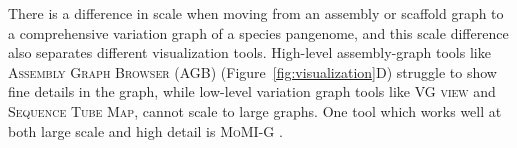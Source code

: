 There is a difference in scale when moving from an assembly or scaffold graph to a comprehensive variation graph of a species pangenome, and this scale difference also separates different visualization tools.
High-level assembly-graph tools like \textsc{Assembly Graph Browser} (\textsc{AGB}) \citep{Mikheenko_2019} (Figure~\ref{fig:visualization}D) struggle to show fine details in the graph, while low-level variation graph tools like \textsc{VG view} \cite{Garrison_2018} and \textsc{Sequence Tube Map}, cannot scale to large graphs.
One tool which works well at both large scale and high detail is \textsc{MoMI-G} \cite{yokoyama_momi-g:_2019}. 
